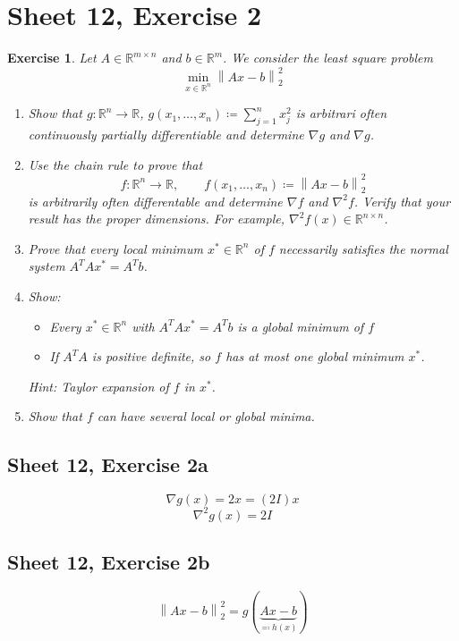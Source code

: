 \documentclass{article}
\newtheorem{ex}{Exercise} %
\newcommand{\norm}[1]{\left\|#1\right\|}
\begin{document}
\section{Sheet 12, Exercise 2}
\begin{ex}
  Let $A \in \mathbb R^{m \times n}$ and $b \in \mathbb R^{m}$. We consider the least square problem
  \[ \min_{x \in \mathbb R^n} \norm{Ax - b}_2^2 \]
  \begin{enumerate}
    \item Show that $g: \mathbb R^n \to \mathbb R$, $g(x_1, \dots, x_n) \coloneqq \sum_{j=1}^n x_j^2$ is arbitrari often continuously partially differentiable and determine $\nabla g$ and $\nabla g$.
    \item Use the chain rule to prove that
      \[ f: \mathbb R^n \to \mathbb R, \qquad f(x_1, \dots, x_n) \coloneqq \norm{Ax - b}_2^2 \]
      is arbitrarily often differentable and determine $\nabla f$ and $\nabla^2 f$. Verify that your result has the proper dimensions. For example, $\nabla^2 f(x) \in \mathbb R^{n \times n}$.
    \item Prove that every local minimum $x^* \in \mathbb R^n$ of $f$ necessarily satisfies the normal system $A^T Ax^* = A^T b$.
    \item Show:
      \begin{itemize}
        \item Every $x^* \in \mathbb R^n$ with $A^T A x^* = A^T b$ is a global minimum of $f$
        \item If $A^T A$ is positive definite, so $f$ has at most one global minimum $x^*$.
      \end{itemize}
      \emph{Hint:} Taylor expansion of $f$ in $x^*$.
    \item Show that $f$ can have several local or global minima.
  \end{enumerate}
\end{ex}

\subsection{Sheet 12, Exercise 2a}

\[ \nabla g(x) = 2x = (2 I) x \]
\[ \nabla^2 g(x) = 2I \]

\subsection{Sheet 12, Exercise 2b}
\[ \norm{Ax - b}_2^2 = g(\underbrace{Ax - b}_{\eqqcolon h(x)}) \]
\end{document}
